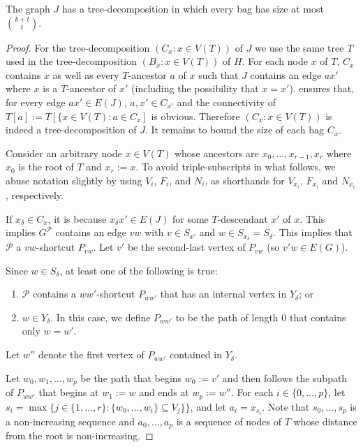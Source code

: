 \documentclass{patmorin}
\begin{document}
\begin{clm}
  The graph $J$ has a tree-decomposition in which every bag has size at most $\binom{k+t}{t}$.
\end{clm}

\begin{proof}
  For the tree-decomposition $(C_x:x\in V(T))$ of $J$ we use the same tree $T$ used in the tree-decomposition $(B_x:x\in V(T))$ of $H$. For each node $x$ of $T$, $C_x$ contains $x$ as well as every $T$-ancestor $a$ of $x$ such that $J$ contains an edge $ax'$ where $x$ is a $T$-ancestor of $x'$ (including the possibility that $x=x'$).
   ensures that, for every edge $ax'\in E(J)$, $a,x'\in C_{x'}$ and the connectivity of $T[a]:=T[\{x\in V(T):a\in C_x]$ is obvious.  Therefore $(C_x:x\in V(T))$ is indeed a tree-decomposition of $J$.  It remains to bound the size of each bag $C_x$. 
  
  Consider an arbitrary node $x\in V(T)$ whose ancestors are $x_0,\ldots,x_{r-1},x_r$ where $x_0$ is the root of $T$ and $x_r:=x$.  To avoid triple-subscripts in what follows, we abuse notation slightly by using $V_i$, $F_i$, and $N_i$,  as shorthands for $V_{x_i}$, $F_{x_i}$ and $N_{x_i}$, respectively.   

  If $x_\delta\in C_x$, it is because $x_\delta x'\in E(J)$ for some $T$-descendant $x'$ of $x$.  This implies $G^{\mathcal{P}}$ contains an edge $vw$ with $v\in S_{x'}$ and $w\in S_{x_\delta}=S_\delta$.  This implies that $\mathcal{P}$ a $vw$-shortcut $P_{vw}$.  Let $v'$ be the second-last vertex of $P_{vw}$ (so $v'w\in E(G)$).  
  
  Since $w\in S_{\delta}$, at least one of the following is true:
  \begin{enumerate}
    \item $\mathcal{P}$ contains a $ww'$-shortcut $P_{ww'}$ that has an internal vertex in $Y_{\delta}$; or
    \item $w\in Y_\delta$.  In this case, we define $P_{ww'}$ to be the path of length 0 that contains only $w=w'$. 
  \end{enumerate}
  Let $w''$ denote the first vertex of $P_{ww'}$ contained in $Y_{\delta}$.
  
  Let $w_0,w_1,\ldots,w_p$ be the path that begins $w_0:=v'$ and then follows the subpath of $P_{ww'}$ that begins at $w_1:=w$ and ends at $w_p:=w''$.  For each $i\in\{0,\ldots,p\}$, let $s_i=\max\{j\in\{1,\ldots,r\}: \{w_0,\ldots,w_i\}\subseteq V_{j}\}\}$, and let $a_i=x_{s_i}$.  Note that $s_0,\ldots,s_p$ is a non-increasing sequence and $a_0,\ldots,a_p$ is a sequence of nodes of $T$ whose distance from the root is non-increasing.


\end{proof}
\end{document}
